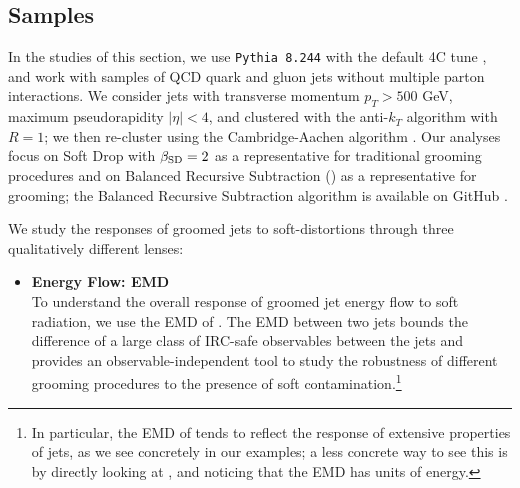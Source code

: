 \begin{subappendices}

\section{Samples}
In the studies of this section, we use \texttt{Pythia 8.244} \cite{Sjostrand:2014zea} with the default 4C tune \cite{Corke:2010yf}, and work with samples of QCD quark and gluon jets without multiple parton interactions.
%
We consider jets with transverse momentum \(p_T > 500\) GeV, maximum pseudorapidity \(|\eta| < 4\), and clustered with the anti-\(k_T\) algorithm \cite{Cacciari:2008gp} with \(R = 1\);
%
we then re-cluster using the Cambridge-Aachen algorithm \cite{Dokshitzer:1997in}.
%
Our analyses focus on Soft Drop with \(\beta_{\rm SD} = 2\) as a representative for traditional grooming procedures and on Balanced Recursive Subtraction () as a representative for \PIRANHA{} grooming;
%
the Balanced Recursive Subtraction algorithm is available on GitHub \cite{piranhagithub}.

We study the responses of groomed jets to \glspl{soft-distortion} through three qualitatively different lenses:
\begin{itemize}
    \item \textbf{Energy Flow: EMD}
    \\
    To understand the overall response of groomed jet energy flow to soft radiation, we use the EMD of .
    The EMD between two jets bounds the difference of a large class of IRC-safe observables between the jets and provides an observable-independent tool to study the robustness of different grooming procedures to the presence of soft contamination.\footnote{
    In particular, the EMD of  tends to reflect the response of extensive properties of jets, as we see concretely in our examples;
    a less concrete way to see this is by directly looking at , and noticing that the EMD has units of energy.
    }


\end{itemize}
\end{subappendices}
